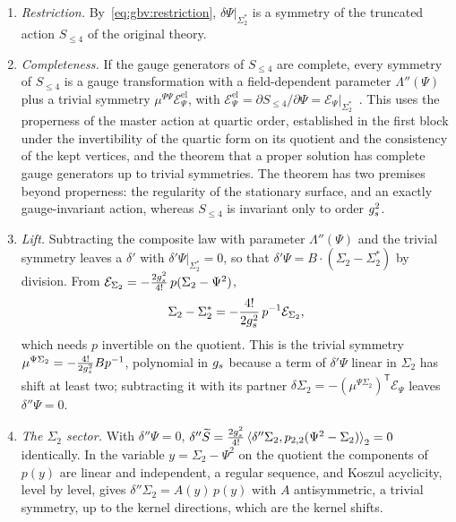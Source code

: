 \begin{enumerate}
  \item \emph{Restriction.} By~\eqref{eq:gbv:restriction}, $\delta \Psi |_{\Sigma_2^*}$ is a symmetry of the truncated action $S_{\le 4}$ of the original theory.
  \item \emph{Completeness.} If the gauge generators of $S_{\le 4}$ are complete, every symmetry of $S_{\le 4}$ is a gauge transformation with a field-dependent parameter $\Lambda''(\Psi)$ plus a trivial symmetry $\mu^{\Psi \Psi} \mathcal E^{\mathrm{el}}_\Psi$, with $\mathcal E^{\mathrm{el}}_\Psi = \partial S_{\le 4} / \partial \Psi = \mathcal E_\Psi |_{\Sigma_2^*}$~\cite{Henneaux:1994:QuantizationGaugeSystems, Gomis:1995:AntibracketAntifieldsGaugeTheory}.
    This uses the properness of the master action at quartic order, established in the first block under the invertibility of the quartic form on its quotient and the consistency of the kept vertices, and the theorem that a proper solution has complete gauge generators up to trivial symmetries.
    The theorem has two premises beyond properness: the regularity of the stationary surface, and an exactly gauge-invariant action, whereas $S_{\le 4}$ is invariant only to order $\gs^2$.
  \item \emph{Lift.} Subtracting the composite law with parameter $\Lambda''(\Psi)$ and the trivial symmetry leaves a $\delta'$ with $\delta' \Psi |_{\Sigma_2^*} = 0$, so that $\delta' \Psi = B \cdot (\Sigma_2 - \Sigma_2^*)$ by division.
    From $\mathcal E_{\Sigma_2} = - \tfrac{2 \gs^2}{4!} \, p(\Sigma_2 - \Psi^2)$,
    \begin{equation}
      \label{eq:gbv:lift}
      \Sigma_2 - \Sigma_2^*
        = - \frac{4!}{2 \gs^2} \, p^{-1} \mathcal E_{\Sigma_2},
    \end{equation}
    which needs $p$ invertible on the quotient.
    This is the trivial symmetry $\mu^{\Psi \Sigma_2} = - \tfrac{4!}{2 \gs^2} B p^{-1}$, polynomial in $\gs$ because a term of $\delta' \Psi$ linear in $\Sigma_2$ has shift at least two; subtracting it with its partner $\delta \Sigma_2 = - (\mu^{\Psi \Sigma_2})^{\mathsf T} \mathcal E_\Psi$ leaves $\delta'' \Psi = 0$.
  \item \emph{The $\Sigma_2$ sector.} With $\delta'' \Psi = 0$, $\delta'' \caction = \tfrac{2 \gs^2}{4!} \pair[2]{\delta'' \Sigma_2}{\sprod{2}{2}(\Psi^2 - \Sigma_2)} = 0$ identically.
    In the variable $y = \Sigma_2 - \Psi^2$ on the quotient the components of $p(y)$ are linear and independent, a regular sequence, and Koszul acyclicity, level by level, gives $\delta'' \Sigma_2 = A(y) \, p(y)$ with $A$ antisymmetric, a trivial symmetry, up to the kernel directions, which are the kernel shifts.
\end{enumerate}


